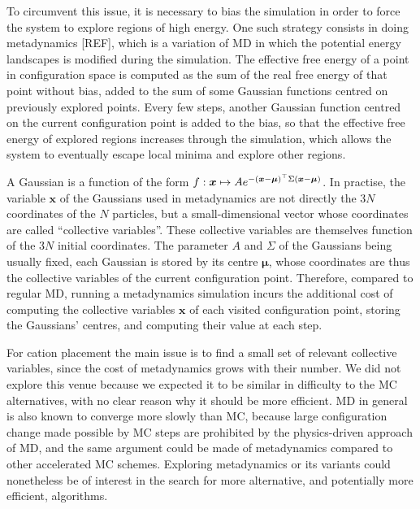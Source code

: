 \documentclass[main.tex]{subfiles}
\begin{document}
To circumvent this issue, it is necessary to bias the simulation in order to force the system to explore regions of high energy. One such strategy consists in doing metadynamics [REF], which is a variation of MD in which the potential energy landscapes is modified during the simulation. The effective free energy of a point in configuration space is computed as the sum of the real free energy of that point without bias, added to the sum of some Gaussian functions centred on previously explored points. Every few steps, another Gaussian function centred on the current configuration point is added to the bias, so that the effective free energy of explored regions increases through the simulation, which allows the system to eventually escape local minima and explore other regions.

A Gaussian is a function of the form $f:\boldsymbol x\mapsto Ae^{-\left(\boldsymbol x - \boldsymbol\mu\right)^\top\Sigma\left(\boldsymbol x - \boldsymbol\mu\right)}$. In practise, the variable $\boldsymbol x$ of the Gaussians used in metadynamics are not directly the $3N$ coordinates of the $N$ particles, but a small-dimensional vector whose coordinates are called ``collective variables''. These collective variables are themselves function of the $3N$ initial coordinates. The parameter $A$ and $\Sigma$ of the Gaussians being usually fixed, each Gaussian is stored by its centre $\boldsymbol\mu$, whose coordinates are thus the collective variables of the current configuration point. Therefore, compared to regular MD, running a metadynamics simulation incurs the additional cost of computing the collective variables $\boldsymbol x$ of each visited configuration point, storing the Gaussians' centres, and computing their value at each step.

For cation placement the main issue is to find a small set of relevant collective variables, since the cost of metadynamics grows with their number. We did not explore this venue because we expected it to be similar in difficulty to the MC alternatives, with no clear reason why it should be more efficient. MD in general is also known to converge more slowly than MC, because large configuration change made possible by MC steps are prohibited by the physics-driven approach of MD, and the same argument could be made of metadynamics compared to other accelerated MC schemes. Exploring metadynamics or its variants could nonetheless be of interest in the search for more alternative, and potentially more efficient, algorithms.

\OnlyInSubfile{\printglobalbibliography}
\end{document}
